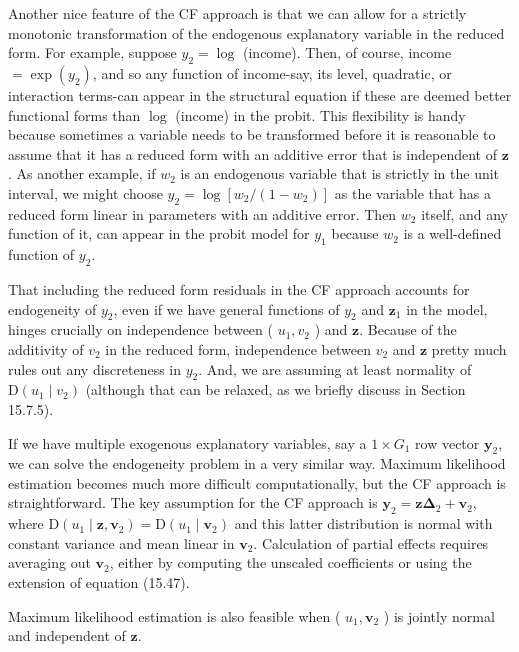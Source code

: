 \documentclass[10pt]{article}
\begin{document}
Another nice feature of the CF approach is that we can allow for a strictly monotonic transformation of the endogenous explanatory variable in the reduced form. For example, suppose $y_{2}=\log$ (income). Then, of course, income $=\exp \left(y_{2}\right)$, and so any function of income-say, its level, quadratic, or interaction terms-can appear in the structural equation if these are deemed better functional forms than $\log$ (income) in the probit. This flexibility is handy because sometimes a variable needs to be transformed before it is reasonable to assume that it has a reduced form with an additive error that is independent of $\mathbf{z}$. As another example, if $w_{2}$ is an endogenous variable that is strictly in the unit interval, we might choose $y_{2}= \log \left[w_{2} /\left(1-w_{2}\right)\right]$ as the variable that has a reduced form linear in parameters with an additive error. Then $w_{2}$ itself, and any function of it, can appear in the probit model for $y_{1}$ because $w_{2}$ is a well-defined function of $y_{2}$.

That including the reduced form residuals in the CF approach accounts for endogeneity of $y_{2}$, even if we have general functions of $y_{2}$ and $\mathbf{z}_{1}$ in the model, hinges crucially on independence between ( $u_{1}, v_{2}$ ) and $\mathbf{z}$. Because of the additivity of $v_{2}$ in the reduced form, independence between $v_{2}$ and $\mathbf{z}$ pretty much rules out any discreteness in $y_{2}$. And, we are assuming at least normality of $\mathrm{D}\left(u_{1} \mid v_{2}\right)$ (although that can be relaxed, as we briefly discuss in Section 15.7.5).

If we have multiple exogenous explanatory variables, say a $1 \times G_{1}$ row vector $\mathbf{y}_{2}$, we can solve the endogeneity problem in a very similar way. Maximum likelihood estimation becomes much more difficult computationally, but the CF approach is straightforward. The key assumption for the CF approach is $\mathbf{y}_{2}=\mathbf{z} \boldsymbol{\Delta}_{2}+\mathbf{v}_{2}$, where $\mathrm{D}\left(u_{1} \mid \mathbf{z}, \mathbf{v}_{2}\right)=\mathrm{D}\left(u_{1} \mid \mathbf{v}_{2}\right)$ and this latter distribution is normal with constant variance and mean linear in $\mathbf{v}_{2}$. Calculation of partial effects requires averaging out $\mathbf{v}_{2}$, either by computing the unscaled coefficients or using the extension of equation (15.47).

Maximum likelihood estimation is also feasible when ( $u_{1}, \mathbf{v}_{2}$ ) is jointly normal and independent of $\mathbf{z}$.
\end{document}
